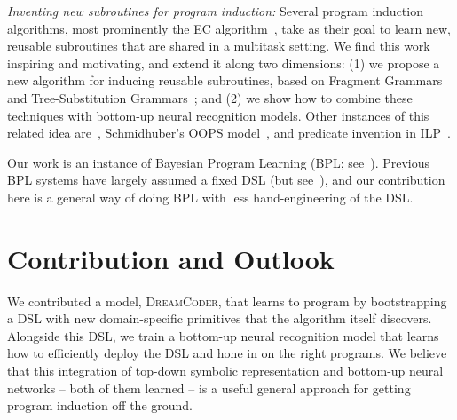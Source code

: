 \documentclass{article}
\newcommand{\systemEnding}{\textsc{DreamCoder}}
\begin{document}
 \noindent \emph{Inventing new subroutines for program induction:}
 Several program induction algorithms, most prominently the EC algorithm~\cite{Dechter:2013:BLV:2540128.2540316}, take as their goal to learn new, reusable subroutines that are shared in a multitask setting. We find this work inspiring and motivating,
 and extend it along two dimensions: (1) we propose a new algorithm for
 inducing reusable subroutines, based on Fragment Grammars~\cite{tim} and Tree-Substitution Grammars~\cite{cohn2010inducing};
 and (2) we show how to combine these techniques with bottom-up neural recognition models.
 Other instances of this related idea are~\cite{DBLP:conf/icml/LiangJK10}, Schmidhuber's OOPS model~\cite{schmidhuber2004optimal}, and predicate invention in ILP~\cite{DBLP:conf/ecai/LinDETM14}.
 
 Our work is an instance of
 Bayesian Program
 Learning (BPL; see~\citep{lake2013one,Dechter:2013:BLV:2540128.2540316,ellis2016sampling,DBLP:conf/icml/LiangJK10}). Previous BPL systems have largely assumed a fixed DSL (but see~\cite{DBLP:conf/icml/LiangJK10}),
 and our contribution here is a general way of doing BPL with less hand-engineering of the DSL.
 
 \section{Contribution and Outlook}
 We contributed a model, \systemEnding, that learns to program by
 bootstrapping a DSL with new domain-specific primitives that the algorithm itself discovers.
  Alongside this DSL, we train a bottom-up
 neural recognition model that learns how to efficiently deploy the
 DSL and hone in on the right programs.  We believe that this
 integration of top-down symbolic representation and bottom-up neural
 networks -- both of them learned -- is a useful general approach for
 getting program induction off the ground. 
  






\end{document}
